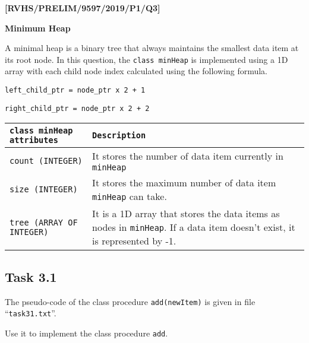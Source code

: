 \item \textbf{{[}RVHS/PRELIM/9597/2019/P1/Q3{]} }

\textbf{Minimum Heap }

A minimal heap is a binary tree that always maintains the smallest
data item at its root node. In this question, the \texttt{class minHeap}
is implemented using a 1D array with each child node index calculated
using the following formula. 

\texttt{left\_child\_ptr = node\_ptr x 2 + 1}

\texttt{right\_child\_ptr = node\_ptr x 2 + 2 }
\begin{center}
\begin{tabular}{|l|l|}
\hline 
\texttt{\textbf{class minHeap attributes}} & \texttt{\textbf{Description}}\tabularnewline
\hline 
\texttt{count (INTEGER)} & It stores the number of data item currently in \texttt{minHeap}\tabularnewline
\hline 
\texttt{size (INTEGER)} & It stores the maximum number of data item \texttt{minHeap} can take.\tabularnewline
\hline 
\texttt{tree (ARRAY OF INTEGER)} & It is a 1D array that stores the data items as nodes in \texttt{minHeap}.
If a data item doesn\textquoteright t exist, it is represented by
-1. \tabularnewline
\hline 
\end{tabular}
\par\end{center}

\subsection*{Task 3.1 }

The pseudo-code of the class procedure \texttt{add(newItem)} is given
in file \textquotedblleft \texttt{task31.txt}\textquotedblright .

Use it to implement the class procedure \texttt{add}. 

